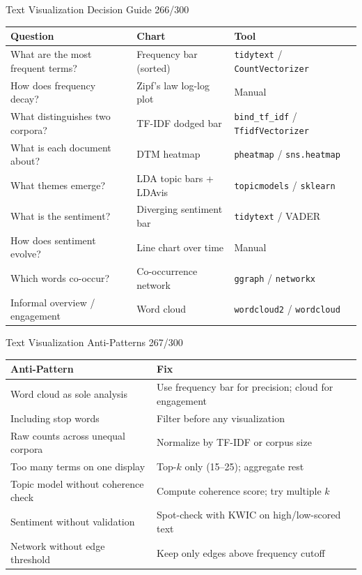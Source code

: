 \documentclass[10pt]{beamer}
\newcommand{\smark}[1]{\hfill{\scriptsize\color{codegray}#1}}
\begin{document}
\begin{frame}{Text Visualization Decision Guide}
\smark{266/300}
\centering\small
\begin{tabular}{@{}lll@{}}
    \toprule
    \textbf{Question} & \textbf{Chart} & \textbf{Tool} \\
    \midrule
    What are the most frequent terms?    & Frequency bar (sorted)     & \texttt{tidytext} / \texttt{CountVectorizer} \\
    How does frequency decay?            & Zipf's law log-log plot    & Manual \\
    What distinguishes two corpora?      & TF-IDF dodged bar          & \texttt{bind\_tf\_idf} / \texttt{TfidfVectorizer} \\
    What is each document about?         & DTM heatmap                & \texttt{pheatmap} / \texttt{sns.heatmap} \\
    What themes emerge?                  & LDA topic bars + LDAvis    & \texttt{topicmodels} / \texttt{sklearn} \\
    What is the sentiment?               & Diverging sentiment bar    & \texttt{tidytext} / VADER \\
    How does sentiment evolve?           & Line chart over time       & Manual \\
    Which words co-occur?                & Co-occurrence network      & \texttt{ggraph} / \texttt{networkx} \\
    Informal overview / engagement       & Word cloud                 & \texttt{wordcloud2} / \texttt{wordcloud} \\
    \bottomrule
\end{tabular}
\end{frame}

\begin{frame}{Text Visualization Anti-Patterns}
\smark{267/300}
\centering\small
\begin{tabular}{@{}ll@{}}
    \toprule
    \textbf{Anti-Pattern} & \textbf{Fix} \\
    \midrule
    Word cloud as sole analysis          & Use frequency bar for precision; cloud for engagement \\
    Including stop words                 & Filter before any visualization \\
    Raw counts across unequal corpora    & Normalize by TF-IDF or corpus size \\
    Too many terms on one display        & Top-$k$ only (15--25); aggregate rest \\
    Topic model without coherence check  & Compute coherence score; try multiple $k$ \\
    Sentiment without validation         & Spot-check with KWIC on high/low-scored text \\
    Network without edge threshold       & Keep only edges above frequency cutoff \\
    \bottomrule
\end{tabular}
\end{frame}
\end{document}
